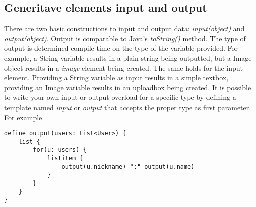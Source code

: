 \subsection{Generitave elements input and output}
There are two basic constructions to input and output data: \emph{input(object)} and \emph{output(object)}. Output is comparable to Java's \emph{toString()} method. The type of output is determined compile-time on the type of the variable provided. For example, a String variable results in a plain string being outputted, but a Image object results in a \emph{image} element being created. 
The same holds for the input element. Providing a String variable as input results in a simple textbox, providing an Image variable results in an uploadbox being created. 
It is possible to write your own input or output overload for a specific type by defining a template named \emph{input} or \emph{output} that accepts the proper type as first parameter. For example
\begin{lstlisting}
define output(users: List<User>) {
	list {
		for(u: users) {
			listitem {
				output(u.nickname) ":" output(u.name)
			}
		}
	}
}
\end{lstlisting}


